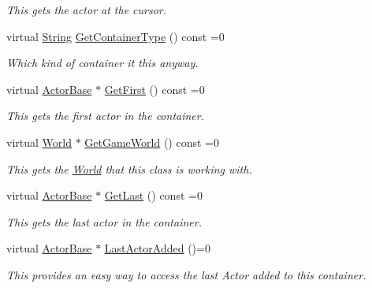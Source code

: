 \begin{DoxyCompactItemize}
\begin{DoxyCompactList}\small\item\em This gets the actor at the cursor. \item\end{DoxyCompactList}\item 
virtual \hyperlink{namespaceMezzanine_acf9fcc130e6ebf08e3d8491aebcf1c86}{String} \hyperlink{classMezzanine_1_1ActorContainerBase_a3516835341b82c71bc50b0a23be85af2}{GetContainerType} () const =0
\begin{DoxyCompactList}\small\item\em Which kind of container it this anyway. \item\end{DoxyCompactList}\item 
virtual \hyperlink{classMezzanine_1_1ActorBase}{ActorBase} $\ast$ \hyperlink{classMezzanine_1_1ActorContainerBase_a886539e9b55e8033b05e7b1aff8d2c59}{GetFirst} () const =0
\begin{DoxyCompactList}\small\item\em This gets the first actor in the container. \item\end{DoxyCompactList}\item 
virtual \hyperlink{classMezzanine_1_1World}{World} $\ast$ \hyperlink{classMezzanine_1_1ActorContainerBase_ae8fe5e37e411504c4b0e044b336118e8}{GetGameWorld} () const =0
\begin{DoxyCompactList}\small\item\em This gets the \hyperlink{classMezzanine_1_1World}{World} that this class is working with. \item\end{DoxyCompactList}\item 
virtual \hyperlink{classMezzanine_1_1ActorBase}{ActorBase} $\ast$ \hyperlink{classMezzanine_1_1ActorContainerBase_ad4fc923758bf4c15e8e6a0e0ad9e0de2}{GetLast} () const =0
\begin{DoxyCompactList}\small\item\em This gets the last actor in the container. \item\end{DoxyCompactList}\item 
virtual \hyperlink{classMezzanine_1_1ActorBase}{ActorBase} $\ast$ \hyperlink{classMezzanine_1_1ActorContainerBase_abccaf443a5acd1c96f7ae1a1cb751f16}{LastActorAdded} ()=0
\begin{DoxyCompactList}\small\item\em This provides an easy way to access the last Actor added to this container. \item\end{DoxyCompactList}\item 

\end{DoxyCompactItemize}

